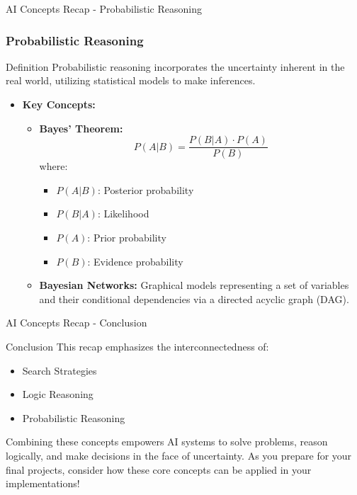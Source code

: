 \documentclass[aspectratio=169]{beamer}
\begin{document}
\begin{frame}[fragile]{AI Concepts Recap - Probabilistic Reasoning}
    \frametitle{Probabilistic Reasoning}

    \begin{block}{Definition}
        Probabilistic reasoning incorporates the uncertainty inherent in the real world, utilizing statistical models to make inferences.
    \end{block}

    \begin{itemize}
        \item \textbf{Key Concepts:}
            \begin{itemize}
                \item \textbf{Bayes' Theorem:} 
                    \begin{equation}
                    P(A|B) = \frac{P(B|A) \cdot P(A)}{P(B)}
                    \end{equation}
                    where:
                    \begin{itemize}
                        \item \( P(A|B) \): Posterior probability
                        \item \( P(B|A) \): Likelihood
                        \item \( P(A) \): Prior probability
                        \item \( P(B) \): Evidence probability
                    \end{itemize}
                \item \textbf{Bayesian Networks:} Graphical models representing a set of variables and their conditional dependencies via a directed acyclic graph (DAG).
            \end{itemize}
    \end{itemize}
\end{frame}

\begin{frame}[fragile]{AI Concepts Recap - Conclusion}
    \begin{block}{Conclusion}
        This recap emphasizes the interconnectedness of:
        \begin{itemize}
            \item Search Strategies
            \item Logic Reasoning
            \item Probabilistic Reasoning
        \end{itemize}
        Combining these concepts empowers AI systems to solve problems, reason logically, and make decisions in the face of uncertainty. 
        As you prepare for your final projects, consider how these core concepts can be applied in your implementations!
    \end{block}
\end{frame}
\end{document}
